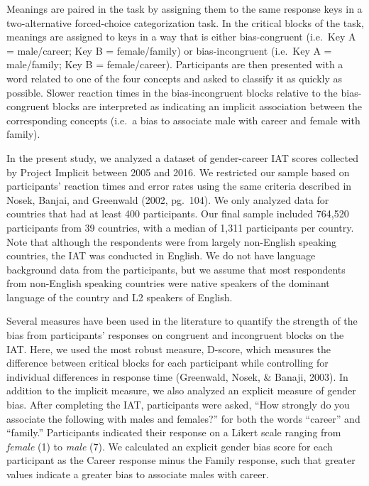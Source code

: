 \documentclass[man,floatsintext]{apa6}
\theoremstyle{definition}
\theoremstyle{definition}
\theoremstyle{definition}
\theoremstyle{remark}
\begin{document}
Meanings are paired in the task by assigning them to the same response
keys in a two-alternative forced-choice categorization task. In the
critical blocks of the task, meanings are assigned to keys in a way that
is either bias-congruent (i.e.~Key A = male/career; Key B =
female/family) or bias-incongruent (i.e.~Key A = male/family; Key B =
female/career). Participants are then presented with a word related to
one of the four concepts and asked to classify it as quickly as
possible. Slower reaction times in the bias-incongruent blocks relative
to the bias-congruent blocks are interpreted as indicating an implicit
association between the corresponding concepts (i.e.~a bias to associate
male with career and female with family).

In the present study, we analyzed a dataset of gender-career IAT scores
collected by Project Implicit between 2005 and 2016. We restricted our
sample based on participants' reaction times and error rates using the
same criteria described in Nosek, Banjai, and Greenwald (2002, pg.~104).
We only analyzed data for countries that had at least 400 participants.
Our final sample included 764,520 participants from 39 countries, with a
median of 1,311 participants per country. Note that although the
respondents were from largely non-English speaking countries, the IAT
was conducted in English. We do not have language background data from
the participants, but we assume that most respondents from non-English
speaking countries were native speakers of the dominant language of the
country and L2 speakers of English.

Several measures have been used in the literature to quantify the
strength of the bias from participants' responses on congruent and
incongruent blocks on the IAT. Here, we used the most robust measure,
D-score, which measures the difference between critical blocks for each
participant while controlling for individual differences in response
time (Greenwald, Nosek, \& Banaji, 2003). In addition to the implicit
measure, we also analyzed an explicit measure of gender bias. After
completing the IAT, participants were asked, \enquote{How strongly do
you associate the following with males and females?} for both the words
\enquote{career} and \enquote{family.} Participants indicated their
response on a Likert scale ranging from \emph{female} (1) to \emph{male}
(7). We calculated an explicit gender bias score for each participant as
the Career response minus the Family response, such that greater values
indicate a greater bias to associate males with career.
\end{document}
